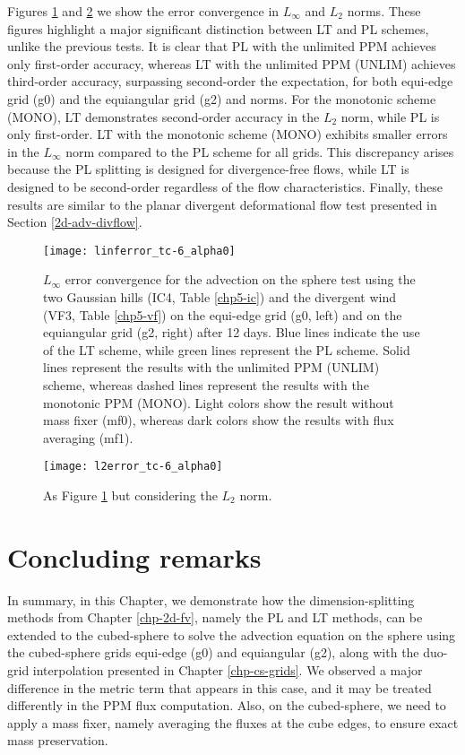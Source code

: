 Figures \ref{chp-advcs-sec-exp-adv4-linf} and \ref{chp-advcs-sec-exp-adv4-l2} we show the error convergence in $L_{\infty}$ and $L_{2}$ norms.
These figures highlight a major significant distinction between LT and PL schemes, unlike the previous tests.
It is clear that PL with the unlimited PPM achieves only first-order accuracy, whereas LT with the unlimited PPM (UNLIM) achieves third-order accuracy, 
surpassing second-order the expectation, for both equi-edge grid (g0) and the equiangular grid (g2) and norms.
For the monotonic  scheme (MONO), LT demonstrates second-order accuracy in the $L_2$ norm, while PL is only first-order.
LT with the monotonic scheme (MONO) exhibits smaller errors in the $L_{\infty}$ norm compared to the PL scheme for all grids.
This discrepancy arises because the PL splitting is designed for divergence-free flows, while LT is designed to be second-order regardless of the flow characteristics.
Finally, these results are similar to the planar divergent deformational flow test presented in Section \ref{2d-adv-divflow}.


\begin{figure}[!htb]
	\centering
	\texttt{[image: linferror\_tc-6\_alpha0]}
	\caption{
		$L_{\infty}$ error convergence for the advection on the sphere test using the two Gaussian hills  (IC4, Table \ref{chp5-ic}) and the divergent wind
		(VF3, Table \ref{chp5-vf}) on the equi-edge grid (g0, left) 
		and on the equiangular grid (g2, right) after 12 days.
		Blue lines indicate the use of the LT scheme, while green lines represent the PL scheme.
		Solid lines represent the results with the unlimited PPM (UNLIM) scheme, whereas dashed lines represent the results with the monotonic PPM (MONO).
		Light colors show the result without mass fixer (mf0), whereas dark colors show the results with flux averaging (mf1).
	\label{chp-advcs-sec-exp-adv4-linf}}
\end{figure}

\begin{figure}[!htb]
	\centering
	\texttt{[image: l2error\_tc-6\_alpha0]}
	\caption{As Figure \ref{chp-advcs-sec-exp-adv4-linf} but considering the $L_2$ norm. \label{chp-advcs-sec-exp-adv4-l2}}
\end{figure}

\newpage
\section{Concluding remarks}
\label{chp-cs-conc}
In summary, in this Chapter, we demonstrate how the dimension-splitting methods from Chapter \ref{chp-2d-fv}, 
namely the PL and LT methods, can be extended to the cubed-sphere to solve the advection equation on the sphere 
using the cubed-sphere grids equi-edge (g0) and equiangular (g2), along with the duo-grid interpolation presented in Chapter \ref{chp-cs-grids}.
We observed a major difference in the metric term that appears in this case, and it may be treated differently in the PPM flux computation.
Also, on the cubed-sphere, we need to apply a mass fixer, namely averaging the fluxes at the cube edges, to ensure exact mass preservation.

